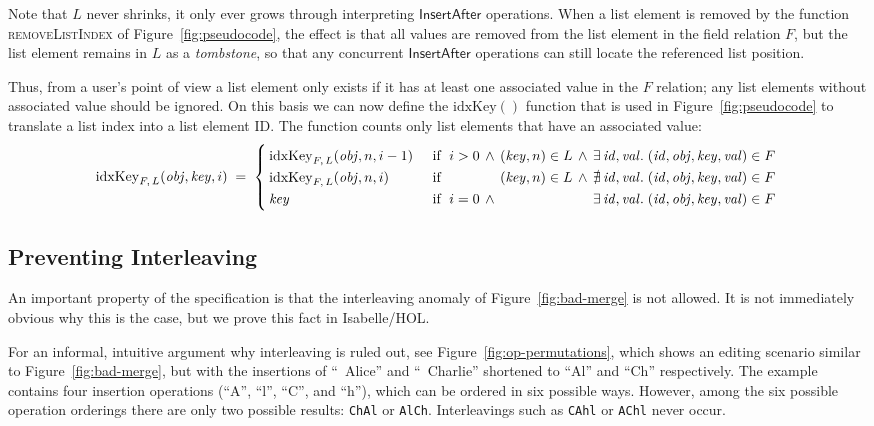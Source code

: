 Note that $L$ never shrinks, it only ever grows through interpreting $\mathsf{InsertAfter}$ operations.
When a list element is removed by the function \textsc{removeListIndex} of Figure~\ref{fig:pseudocode}, the effect is that all values are removed from the list element in the field relation $F$, but the list element remains in $L$ as a \emph{tombstone}, so that any concurrent $\mathsf{InsertAfter}$ operations can still locate the referenced list position.

Thus, from a user's point of view a list element only exists if it has at least one associated value in the $F$ relation; any list elements without associated value should be ignored.
On this basis we can now define the $\mathrm{idxKey}()$ function that is used in Figure~\ref{fig:pseudocode} to translate a list index into a list element ID.
The function counts only list elements that have an associated value:
\[ \mathrm{idxKey}_{F,\, L}(\mathit{obj}, \mathit{key}, i) \;=\; \left\{
   \arraycolsep=2pt \def\arraystretch{1.3}
   \begin{array}{llllll}
       \mathrm{idxKey}_{F,\, L}(\mathit{obj}, n, i-1) &
       \quad\text{if }\; i > 0 & \wedge & (\mathit{key}, n) \in L & \wedge &
       \exists\,\mathit{id}, \mathit{val}.\; (\mathit{id}, \mathit{obj}, \mathit{key}, \mathit{val}) \in F \\
       \mathrm{idxKey}_{F,\, L}(\mathit{obj}, n, i) &
       \quad\text{if }\; && (\mathit{key}, n) \in L & \wedge &
       \nexists\,\mathit{id}, \mathit{val}.\; (\mathit{id}, \mathit{obj}, \mathit{key}, \mathit{val}) \in F \\
       \mathit{key} &
       \quad\text{if }\; i = 0 & \wedge &&&
       \exists\,\mathit{id}, \mathit{val}.\; (\mathit{id}, \mathit{obj}, \mathit{key}, \mathit{val}) \in F \\
   \end{array} \right. \]

\subsection{Preventing Interleaving}

An important property of the specification is that the interleaving anomaly of Figure~\ref{fig:bad-merge} is not allowed.
It is not immediately obvious why this is the case, but we prove this fact in Isabelle/HOL.

For an informal, intuitive argument why interleaving is ruled out, see Figure~\ref{fig:op-permutations}, which shows an editing scenario similar to Figure~\ref{fig:bad-merge}, but with the insertions of ``~Alice'' and ``~Charlie'' shortened to ``Al'' and ``Ch'' respectively.
The example contains four insertion operations (``A'', ``l'', ``C'', and ``h''), which can be ordered in six possible ways.
However, among the six possible operation orderings there are only two possible results: \texttt{ChAl} or \texttt{AlCh}.
Interleavings such as \texttt{CAhl} or \texttt{AChl} never occur.

